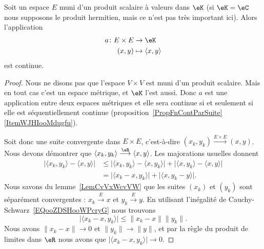 \begin{proposition}          \label{PROPooKDGOooDjWQct}
	Soit un espace \( E\) muni d'un produit scalaire à valeurs dans \( \eK\) (si \( \eK=\eC\) nous supposons le produit hermitien, mais ce n'est pas très important ici). Alors l'application
	\begin{equation}
		\begin{aligned}
			a\colon E\times E & \to \eK                     \\
			(x,y)             & \mapsto \langle x, y\rangle
		\end{aligned}
	\end{equation}
	est continue.
\end{proposition}

\begin{proof}
	Nous ne disons pas que l'espace \( V\times V\) est muni d'un produit scalaire. Mais en tout cas c'est un espace métrique, et \( \eK\) l'est aussi. Donc \( a\) est une application entre deux espaces métriques et elle sera continue si et seulement si elle est séquentiellement continue (proposition~\ref{PropFnContParSuite}\ref{ItemWJHIooMdugfu}).

	Soit donc une suite convergente dans \( E\times E\), c'est-à-dire \( (x_k,y_k)\stackrel{E\times E}{\longrightarrow}(x,y)\). Nous devons démontrer que \( \langle x_k, y_k\rangle \stackrel{\eR}{\longrightarrow}\langle x, y\rangle \). Les majorations usuelles donnent
	\begin{subequations}
		\begin{align}
			\big| \langle x_k, y_k\rangle -\langle x, y\rangle  \big| & \leq \big| \langle x_k, y_k\rangle -\langle x, y_k\rangle  \big|+\big| \langle x, y_k\rangle -\langle x, y\rangle  \big| \\
			                                                          & =\big| \langle x_k-x, y_k\rangle  \big|+\big| \langle x, y_k-y\rangle  \big|.
		\end{align}
	\end{subequations}
	Nous savons du lemme~\ref{LemCvVxWcvVW} que les suites \( (x_k)\) et \( (y_k)\) sont séparément convergentes : \( x_k\stackrel{E}{\longrightarrow}x\) et \( y_k\stackrel{E}{\longrightarrow}y\). En utilisant l'inégalité de Cauchy-Schwarz~\ref{EQooZDSHooWPcryG} nous trouvons
	\begin{equation}
		\big| \langle x_k-x, y_k\rangle  \big|\leq \| x_k-x \|\| y_k \|.
	\end{equation}
	Nous avons \( \| x_k-x \|\to 0\) et \( \| y_k \|\to \| y \|\), et par la règle du produit de limites dans \( \eR\) nous avons que \( \big| \langle x_k-x, y_k\rangle  \big|\to 0\).
\end{proof}

